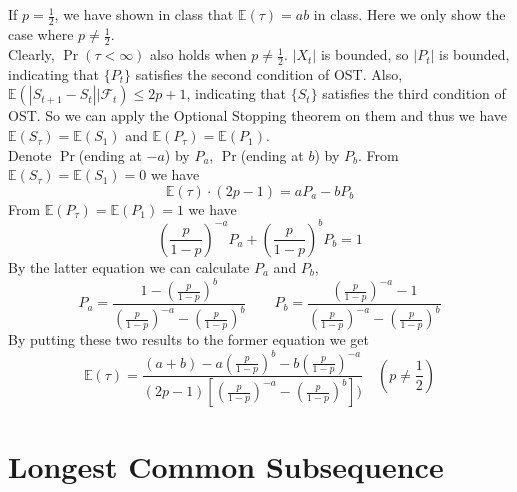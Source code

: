 \documentclass[12pt,letterpaper]{article}
\begin{document}
\subsection{}
If $p=\frac{1}{2}$, we have shown in class that $\mathbb{E}(\tau)=ab$ in class.
Here we only show the case where $p\neq\frac{1}{2}$.\\
Clearly, $\Pr(\tau<\infty)$ also holds when $p\neq\frac{1}{2}$. 
$|X_t|$ is bounded, so $|P_t|$ is bounded,
indicating that $\{P_t\}$ satisfies the second condition of OST.
Also, $\mathbb{E}(|S_{t+1}-S_{t}||\mathcal{F}_t)\leq 2p+1$,
indicating that $\{S_t\}$ satisfies the third condition of OST.
So we can apply the Optional Stopping theorem on them and thus we have
$\mathbb{E}(S_{\tau})=\mathbb{E}(S_{1})$ and $\mathbb{E}(P_{\tau})=\mathbb{E}(P_{1})$.\\
Denote $\Pr$(ending at $-a$) by $P_a$, $\Pr$(ending at $b$) by $P_b$.
From $\mathbb{E}(S_{\tau})=\mathbb{E}(S_{1})=0$ we have 
$$\mathbb{E}(\tau)\cdot(2p-1)=aP_a-bP_b$$
From $\mathbb{E}(P_{\tau})=\mathbb{E}(P_{1})=1$ we have
$$\left(\frac{p}{1-p}\right)^{-a}P_a+\left(\frac{p}{1-p}\right)^{b}P_b=1$$
By the latter equation we can calculate $P_a$ and $P_b$,
$$P_a=\frac{1-\left(\frac{p}{1-p}\right)^b}{\left(\frac{p}{1-p}\right)^{-a}-\left(\frac{p}{1-p}\right)^b}\qquad
P_b=\frac{\left(\frac{p}{1-p}\right)^{-a}-1}{\left(\frac{p}{1-p}\right)^{-a}-\left(\frac{p}{1-p}\right)^b}$$
By putting these two results to the former equation we get
$$\mathbb{E}(\tau)=\frac{(a+b)-a\left(\frac{p}{1-p}\right)^b-b\left(\frac{p}{1-p}\right)^{-a}}
{(2p-1)\left[\left(\frac{p}{1-p}\right)^{-a}-\left(\frac{p}{1-p}\right)^b\right])} \quad (p\neq\frac{1}{2})$$

\section{Longest Common Subsequence}
\end{document}
